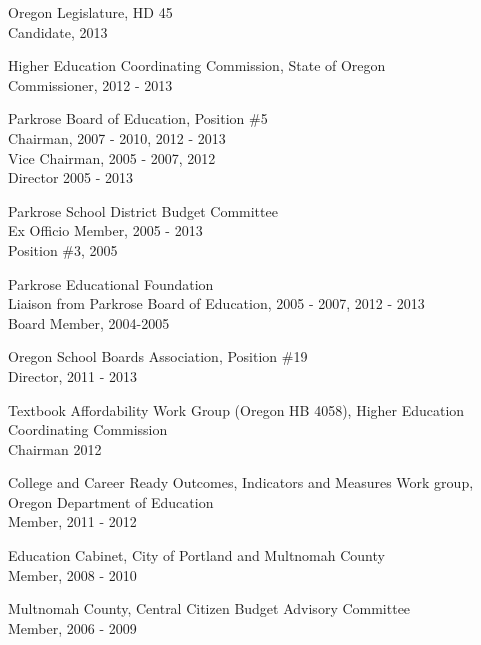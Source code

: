 \documentclass[Computer Science]{vita}
\begin{document}
\begin{vita}
\begin{Professional and Service Activities}
\begin{University}
    \end{University}

    \begin{Community}
    

    
\item Oregon Legislature, HD 45\\ Candidate, 2013

\item Higher Education Coordinating Commission, State of Oregon\\
Commissioner, 2012 - 2013

    \item Parkrose Board of Education, Position \#5\\
      Chairman, 2007 - 2010, 2012 - 2013\\
      Vice Chairman, 2005 - 2007, 2012 \\
      Director 2005 - 2013

    \item Parkrose School District Budget Committee\\
      Ex Officio Member, 2005 - 2013\\
      Position \#3, 2005

\item Parkrose Educational Foundation\\
      Liaison from Parkrose Board of Education, 2005 - 2007, 2012 - 2013\\
      Board Member, 2004-2005


    \item Oregon School Boards Association, Position \#19\\
    Director, 2011 - 2013

  \item Textbook Affordability Work Group (Oregon HB 4058), Higher Education Coordinating Commission\\ Chairman 2012

\item College and Career Ready Outcomes, Indicators and Measures Work group, Oregon Department of Education\\
Member, 2011 -  2012

    \item  Education Cabinet, City of Portland and Multnomah County\\
      Member, 2008 - 2010

    \item Multnomah County, Central Citizen Budget Advisory Committee\\
      Member, 2006 - 2009


\end{Community}
\end{Professional and Service Activities}
\end{vita}
\end{document}
